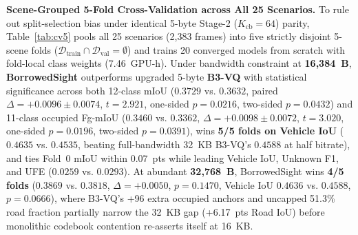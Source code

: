 \documentclass[journal]{IEEEtran}
\begin{document}
\textbf{Scene-Grouped 5-Fold Cross-Validation across All 25 Scenarios.} To rule out split-selection bias under identical 5-byte Stage-2 ($K_{\mathrm{cb}} = 64$) parity, Table~\ref{tab:cv5} pools all 25 scenarios (2,383 frames) into five strictly disjoint 5-scene folds ($\mathcal{D}_{\mathrm{train}} \cap \mathcal{D}_{\mathrm{val}} = \emptyset$) and trains 20 converged models from scratch with fold-local class weights (7.46~GPU-h). Under bandwidth constraint at \textbf{16,384~B}, \textbf{BorrowedSight} outperforms upgraded 5-byte \textbf{B3-VQ} with statistical significance across both 12-class mIoU ($0.3729$ vs. $0.3632$, paired $\Delta = +0.0096 \pm 0.0074$, $t = 2.921$, one-sided $p = 0.0216$, two-sided $p = 0.0432$) and 11-class occupied Fg-mIoU ($0.3460$ vs. $0.3362$, $\Delta = +0.0098 \pm 0.0072$, $t = 3.020$, one-sided $p = 0.0196$, two-sided $p = 0.0391$), wins \textbf{5/5 folds on Vehicle IoU} ($0.4635$ vs. $0.4535$, beating full-bandwidth 32~KB B3-VQ's $0.4588$ at half bitrate), and ties Fold~0 mIoU within 0.07~pts while leading Vehicle IoU, Unknown F1, and UFE ($0.0259$ vs. $0.0293$). At abundant \textbf{32,768~B}, BorrowedSight wins \textbf{4/5 folds} ($0.3869$ vs. $0.3818$, $\Delta = +0.0050$, $p = 0.1470$, Vehicle IoU $0.4636$ vs. $0.4588$, $p = 0.0666$), where B3-VQ's +96 extra occupied anchors and uncapped 51.3\% road fraction partially narrow the 32~KB gap (+6.17~pts Road IoU) before monolithic codebook contention re-asserts itself at 16~KB.
\end{document}
